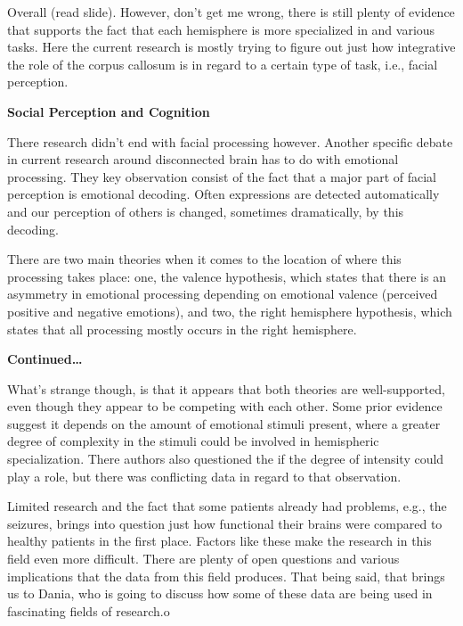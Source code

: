 \documentclass[basic]{inVerba-notes}
\begin{document}
Overall (read slide). However, don't get me wrong, there is still plenty of evidence that supports the fact that each hemisphere is more specialized in and various tasks. Here the current research is mostly trying to figure out just how integrative the role of the corpus callosum is in regard to a certain type of task, i.e., facial perception.

\textbf{Social Perception and Cognition}

There research didn't end with facial processing however. Another specific debate in current research around disconnected brain has to do with emotional processing. They key observation consist of the fact that a major part of facial perception is emotional decoding. Often expressions are detected automatically and our perception of others is changed, sometimes dramatically, by this decoding. 

There are two main theories when it comes to the location of where this processing takes place: one, the valence hypothesis, which states that there is an asymmetry in emotional processing depending on emotional valence (perceived positive and negative emotions), and two, the right hemisphere hypothesis, which states that all processing mostly occurs in the right hemisphere.

\textbf{Continued\dots}

What's strange though, is that it appears that both theories are well-supported, even though they appear to be competing with each other. Some prior evidence suggest it depends on the amount of emotional stimuli present, where a greater degree of complexity in the stimuli could be involved in hemispheric specialization. There authors also questioned the if the degree of intensity could play a role, but there was conflicting data in regard to that observation. 

Limited research and the fact that some patients already had problems, e.g., the seizures, brings into question just how functional their brains were compared to healthy patients in the first place. Factors like these make the research in this field even more difficult. There are plenty of open questions and various implications that the data from this field produces. That being said, that brings us to Dania, who is going to discuss how some of these data are being used in fascinating fields of research.o
\end{document}
